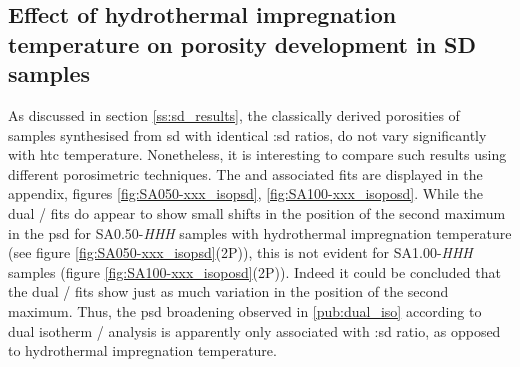 \subsection{Effect of hydrothermal impregnation temperature on porosity development in SD samples}

As discussed in section \ref{ss:sd_results}, the classically derived porosities of samples synthesised from \acrfull{sd} with identical :\acrshort{sd} ratios, do not vary significantly with \acrshort{htc} temperature. Nonetheless, it is interesting to compare such results using different porosimetric techniques. The  and associated fits are displayed in the appendix, figures \ref{fig:SA050-xxx_isopsd}, \ref{fig:SA100-xxx_isoposd}. While the dual / fits do appear to show small shifts in the position of the second maximum in the \acrshort{psd} for SA0.50-\textit{HHH} samples with hydrothermal impregnation temperature (see figure \ref{fig:SA050-xxx_isopsd}(2P)), this is not evident for SA1.00-\textit{HHH} samples (figure \ref{fig:SA100-xxx_isoposd}(2P)). Indeed it could be concluded that the dual / fits show just as much variation in the position of the second maximum. Thus, the \acrshort{psd} broadening observed in \ref{pub:dual_iso} according to dual isotherm / analysis is apparently only associated with :\acrshort{sd} ratio, as opposed to hydrothermal impregnation temperature.

